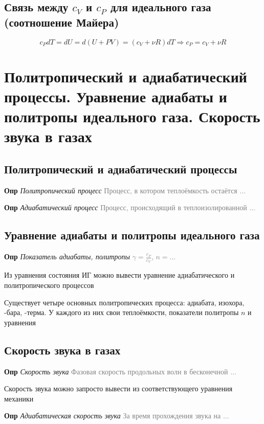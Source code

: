 \documentclass[a4paper, 14pt]{article}
\begin{document}
    \subsection{Связь между $c_V$ и $c_P$ для идеального газа (соотношение Майера)}

    \[ c_P dT = dU = d(U + PV) = (c_V + \nu R) dT \Rightarrow c_P = c_V + \nu R\]

    \section{Политропический и адиабатический процессы.
    Уравнение адиабаты и политропы идеального газа.
    Скорость звука в газах}

    \subsection{Политропический и адиабатический процессы}

    \textbf{Опр} \textit{Политропический процесс} \textcolor{gray}{Процесс, в котором теплоёмкость остаётся ...}

    \textbf{Опр} \textit{Адиабатический процесс} \textcolor{gray}{Процесс, происходящий в теплоизолированной ...}

    \subsection{Уравнение адиабаты и политропы идеального газа}

    \textbf{Опр} \textit{Показатель адиабаты, политропы} \textcolor{gray}{$\gamma = \frac{c_P}{c_V}$, $n = \dots$}

    Из уравнения состояния ИГ можно вывести уравнение адиабатического и политропического процессов

    Существует четыре основных политропических процесса: адиабата, изохора, -бара, -терма.
    У каждого из них свои теплоёмкости, показатели политропы $n$ и уравнения

    \subsection{Скорость звука в газах}

    \textbf{Опр} \textit{Скорость звука} \textcolor{gray}{Фазовая скорость продольных волн в бесконечной ...}

    Скорость звука можно запросто вывести из соответствующего уравнения механики

    \textbf{Опр} \textit{Адиабатическая скорость звука} \textcolor{gray}{За время прохождения звука на ...}
\end{document}
